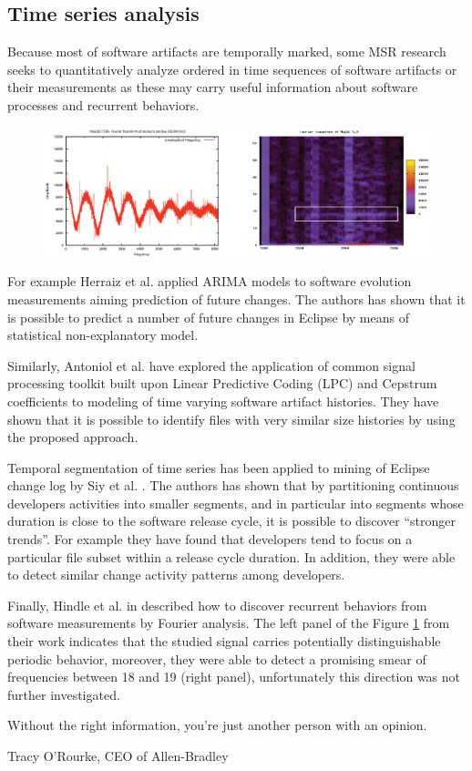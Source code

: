 \subsection{Time series analysis}\label{chapter2_section-tsanalysis}
Because most of software artifacts are temporally marked, some MSR research seeks to quantitatively analyze ordered 
in time sequences of software artifacts or their measurements as these may carry useful information about software 
processes and recurrent behaviors. 

\begin{figure}[t!]
   \centering
   \includegraphics[width=145mm]{figures/FourrierMySQL.eps}
   \caption{}
   \label{fig:mysql-fourrier}
\end{figure}

For example Herraiz et al. \cite{citeulike:6544685} applied ARIMA models to software evolution measurements aiming 
prediction of future changes. The authors has shown that it is possible to predict a number of future changes in 
Eclipse by means of statistical non-explanatory model. 

Similarly, Antoniol et al. \cite{citeulike:3378725} have explored the application of common signal processing toolkit 
built upon Linear Predictive Coding (LPC) and Cepstrum coefficients to modeling of time varying software artifact 
histories. They have shown that it is possible to identify files with very similar size histories by using the 
proposed approach.

Temporal segmentation of time series has been applied to mining of Eclipse change log by Siy et al. \cite{citeulike:10896305}.
The authors has shown that by partitioning continuous developers activities into smaller segments, 
and in particular into segments whose duration is close to the software release cycle,
it is possible to discover ``stronger trends''. For example they have found that developers tend to focus on a particular file 
subset within a release cycle duration. In addition, they were able to detect similar change activity patterns among developers.

Finally, Hindle et al. in \cite{citeulike:10377345} described how to discover recurrent behaviors from software measurements 
by Fourier analysis. The left panel of the Figure \ref{fig:mysql-fourrier} from their work indicates that the studied 
signal carries potentially distinguishable periodic behavior, moreover, they were able to detect a promising smear 
of frequencies between 18 and 19 (right panel), unfortunately this direction was not further investigated.

\epigraph{Without the right information, you're just another person with an opinion.}{Tracy O'Rourke, CEO of Allen-Bradley}